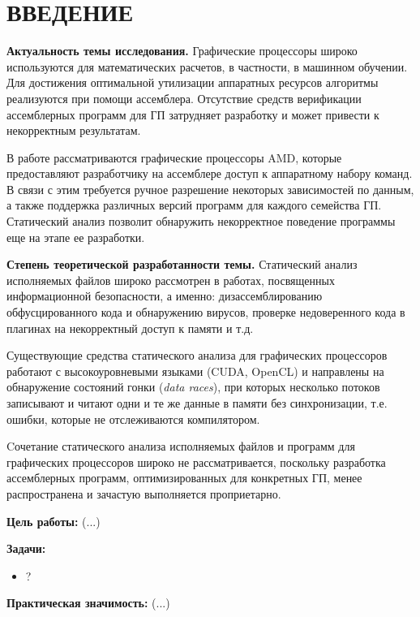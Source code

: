 \documentclass[a4paper,14pt]{extarticle}
\newcommand{\topic}[2]{\textbf{#1.} #2\newline}
\newenvironment{ul}{\begin{itemize}[noitemsep,topsep=0em]}{\end{itemize}\vspace{0.2mm}}
\begin{document}
\tableofcontents
\newpage

\section*{ВВЕДЕНИЕ}

\topic{Актуальность темы исследования}{Графические процессоры широко используются
для математических расчетов, в частности, в машинном обучении. Для достижения оптимальной
утилизации аппаратных ресурсов алгоритмы реализуются при помощи ассемблера.
Отсутствие средств верификации ассемблерных программ для ГП затрудняет разработку
и может привести к некорректным результатам.

В работе рассматриваются графические процессоры AMD, которые предоставляют разработчику
на ассемблере доступ к аппаратному набору команд. В связи с этим требуется ручное
разрешение некоторых зависимостей по данным, а также поддержка различных версий программ
для каждого семейства ГП. Статический анализ позволит обнаружить некорректное
поведение программы еще на этапе ее разработки.}

\topic{Степень теоретической разработанности темы}{Статический анализ исполняемых файлов
широко рассмотрен в работах, посвященных информационной безопасности, а именно:
дизассемблированию обфусцированного кода и обнаружению вирусов,
проверке недоверенного кода в плагинах на некорректный доступ к памяти и т.д.

Существующие средства статического анализа для графических процессоров работают с
высокоуровневыми языками (CUDA, OpenCL) и направлены на обнаружение состояний
гонки (\textit{data races}), при которых несколько потоков записывают
и читают одни и те же данные в памяти без синхронизации, т.е. ошибки, которые
не отслеживаются компилятором.

Cочетание статического анализа исполняемых файлов и программ для графических
процессоров широко не рассматривается, поскольку разработка ассемблерных программ,
оптимизированных для конкретных ГП, менее распространена и зачастую выполняется
проприетарно.}

\textbf{Цель работы:} (...)

\textbf{Задачи:}
\begin{ul}
\item ?
\end{ul}

\textbf{Практическая значимость:} (...)
\end{document}
